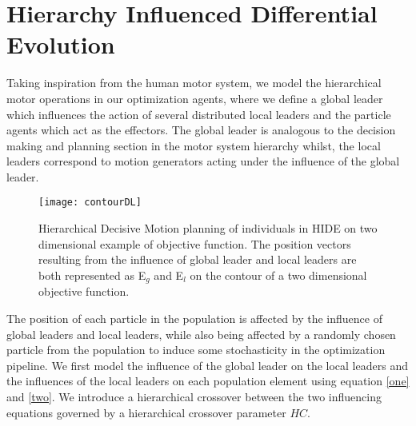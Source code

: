 \section{Hierarchy Influenced Differential Evolution}

Taking inspiration from the human motor system, we model the hierarchical motor operations in our optimization agents, where we define a global leader which influences the action of several distributed local leaders and the particle agents which act as the effectors. The global leader is analogous to the decision making and planning section in the motor system hierarchy whilst, the local leaders correspond to motion generators acting under the influence of the  global leader.

\begin{figure}[h!]
  \texttt{[image: contourDL]}
  \caption{Hierarchical Decisive Motion planning of individuals in HIDE on two dimensional example of objective function. The position vectors resulting from the influence of global leader and local leaders are both represented
as E$_{g}$ and E$_{l}$ on the contour of a two dimensional objective function.}
  \label{fig:contourDL}
\end{figure}

The position of each particle in the population is affected by the influence of global leaders and local leaders, while also being affected by a randomly chosen particle from the population to induce some stochasticity in the optimization pipeline. We first model the influence of the global leader on the local leaders and the influences of the local leaders  on each population element using equation \eqref{one} and \eqref{two}. We introduce a hierarchical crossover between the two influencing equations governed by a hierarchical crossover parameter $HC$.

